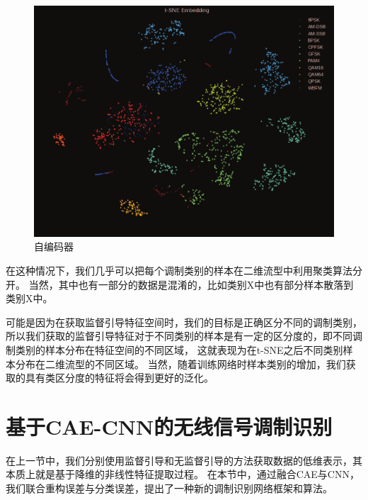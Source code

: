 \begin{figure}[!h]
	\centering
	\includegraphics[scale=0.2]{figures/chapter_3/surprised_fea}
	\caption{自编码器}	\label{sec:fig_3_7}
\end{figure}

在这种情况下，我们几乎可以把每个调制类别的样本在二维流型中利用聚类算法分开。
当然，其中也有一部分的数据是混淆的，比如类别X中也有部分样本散落到类别X中。\par
可能是因为在获取监督引导特征空间时，我们的目标是正确区分不同的调制类别，
所以我们获取的监督引导特征对于不同类别的样本是有一定的区分度的，即不同调制类别的样本分布在特征空间的不同区域，
这就表现为在t-SNE之后不同类别样本分布在二维流型的不同区域。
当然，随着训练网络时样本类别的增加，我们获取的具有类区分度的特征将会得到更好的泛化。\par


\section{基于CAE-CNN的无线信号调制识别}

在上一节中，我们分别使用监督引导和无监督引导的方法获取数据的低维表示，其本质上就是基于降维的非线性特征提取过程。
在本节中，通过融合CAE与CNN，我们联合重构误差与分类误差，提出了一种新的调制识别网络框架和算法。

